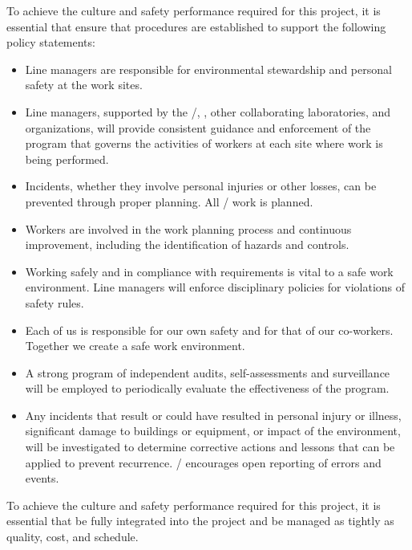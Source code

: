 To achieve the culture and safety performance required for this
project, it is essential that  ensure that procedures
are established to support the following  policy
statements:
\begin{itemize}
  \item Line managers are responsible for environmental stewardship
    and personal safety at the  work sites.
  \item Line managers, supported by the /,
    \fnal, other collaborating laboratories, and \surf {}
    organizations, will provide consistent guidance and enforcement of
    the  program that governs the activities of workers at each
    site where work is being performed.
  \item Incidents, whether they involve personal injuries or other
    losses, can be prevented through proper planning. All
    / work is planned.
  \item Workers are involved in the work planning process and
    continuous improvement, including the identification of hazards
    and controls.
  \item Working safely and in compliance with requirements is vital to
    a safe work environment. Line managers will enforce disciplinary
    policies for violations of safety rules.
  \item Each of us is responsible for  our own safety and for that of
    our co-workers. Together we create a safe work environment.
  \item A strong program of independent audits, self-assessments and
    surveillance will be employed to periodically evaluate the
    effectiveness of the  program.
  \item Any incidents that result or could have resulted in personal
    injury or illness, significant damage to buildings or equipment,
    or impact of the environment, will be investigated to determine
    corrective actions and lessons that can be applied to prevent
    recurrence. / encourages open reporting of
    errors and events.
\end{itemize}

To achieve the culture and safety performance required for this
project, it is essential that  be fully integrated into the
project and be managed as tightly as quality, cost, and schedule.
